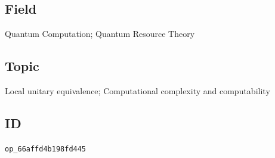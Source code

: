 \subsection*{Field}

Quantum Computation; Quantum Resource Theory

\subsection*{Topic}

Local unitary equivalence; Computational complexity and computability

\subsection*{ID}

\texttt{op\_66affd4b198fd445}

